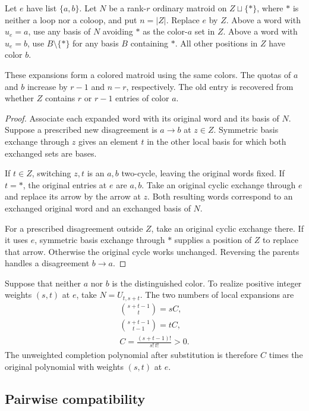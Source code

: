 Let $e$ have list $\{a,b\}$. Let $N$ be a rank-$r$ ordinary
matroid on $Z\sqcup\{*\}$, where $*$ is neither a loop nor a coloop,
and put $n=|Z|$. Replace $e$ by $Z$. Above a word with $u_e=a$, use
any basis of $N$ avoiding $*$ as the color-$a$ set in $Z$. Above a
word with $u_e=b$, use $B\setminus\{*\}$ for any basis $B$ containing
$*$. All other positions in $Z$ have color $b$.

\begin{proposition}
These expansions form a colored matroid using the same colors.
The quotas of $a$ and $b$ increase by $r-1$ and $n-r$,
respectively. The old entry is recovered from whether $Z$ contains
$r$ or $r-1$ entries of color $a$.
\end{proposition}

\begin{proof}
Associate each expanded word with its original word and its basis
of $N$. Suppose a prescribed new disagreement is $a\to b$ at $z\in Z$.
Symmetric basis exchange through $z$ gives an element $t$ in the other
local basis for which both exchanged sets are bases.

If $t\in Z$, switching $z,t$ is an $a,b$ two-cycle, leaving the
original words fixed. If $t=*$, the original entries at $e$ are $a,b$. Take an
original cyclic exchange through $e$ and replace its arrow by the arrow at
$z$. Both resulting words correspond to an exchanged original word
and an exchanged basis of $N$.

For a prescribed disagreement outside $Z$, take an original cyclic exchange
there. If it uses $e$, symmetric basis exchange through $*$ supplies
a position of $Z$ to replace that arrow. Otherwise the original cycle
works unchanged. Reversing the parents handles a disagreement $b\to a$.
\end{proof}

Suppose that neither $a$ nor $b$ is the distinguished color. To realize
positive integer weights $(s,t)$ at $e$, take $N=U_{t,s+t}$. The two
numbers of local expansions are
\[
 \begin{gathered}
 \binom{s+t-1}{t}=sC,\\
 \binom{s+t-1}{t-1}=tC,\\
 C=\frac{(s+t-1)!}{s!\,t!}>0.
 \end{gathered}
\]
The unweighted completion polynomial after substitution is therefore
$C$ times the original polynomial with weights $(s,t)$ at $e$.

\subsection[quadraticCompatibility]{Pairwise compatibility}

